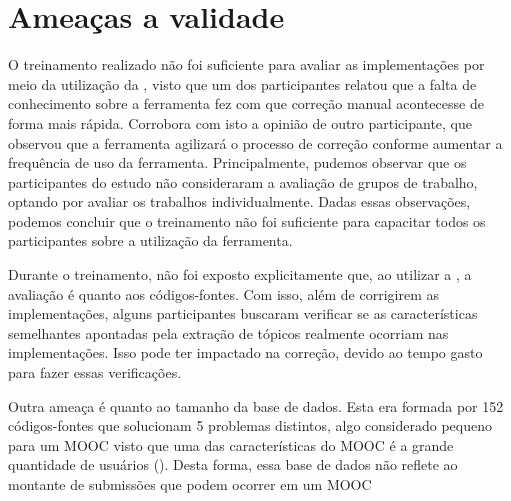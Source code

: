 %	
%	
%
%
%

	\section{Ameaças a validade}
	\label{sec:ameacas}
	
		O treinamento realizado não foi suficiente para avaliar as implementações por meio
		da utilização da , visto que um dos participantes relatou que
		a falta de conhecimento sobre a ferramenta fez com que correção manual acontecesse de
		forma mais rápida. Corrobora com isto a opinião de outro participante, que observou que a ferramenta agilizará
		o processo de correção conforme aumentar a frequência de uso da ferramenta. 
		Principalmente, pudemos observar que os participantes do estudo não consideraram a
		avaliação de grupos de trabalho, optando por avaliar os trabalhos individualmente.
		Dadas essas observações, podemos concluir que o treinamento não foi suficiente para
		capacitar todos os participantes sobre a utilização da ferramenta.
		
		Durante o treinamento, não foi exposto explicitamente que, ao utilizar a ,
		a avaliação é quanto aos códigos-fontes. Com isso, além de corrigirem as implementações,
		alguns participantes buscaram verificar se as características semelhantes apontadas
		pela extração de tópicos realmente ocorriam nas implementações. Isso pode ter
		impactado na correção, devido ao tempo gasto para fazer essas verificações.
		
		Outra ameaça é quanto ao tamanho da base de dados.
		Esta era formada por 152 códigos-fontes que solucionam 5 problemas distintos, algo
		considerado pequeno para um MOOC visto que uma das características do \ac{MOOC} é a grande
		quantidade de usuários (). Desta forma, essa base de dados não
		reflete ao montante de submissões que podem ocorrer em um \acs{MOOC}
		
